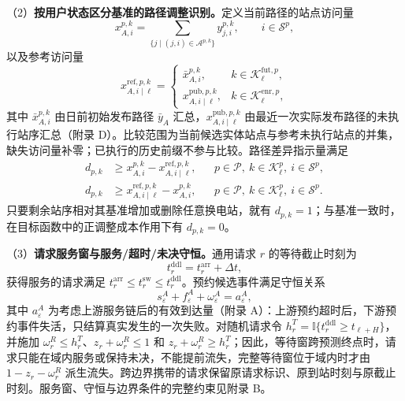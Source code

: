 \documentclass[12pt,a4paper,UTF8]{ctexart}
\begin{document}
（2）\textbf{按用户状态区分基准的路径调整识别。}定义当前路径的站点访问量
\begin{equation}
x_{A,i}^{p,k}
=
\sum_{\{j\mid(j,i)\in\mathcal A^{p,k}\}}y_{j,i}^{p,k},
\qquad i\in\mathcal S^p,
\label{eq:station_visit_indicator}
\end{equation}
以及参考访问量
\begin{equation}
x_{A,i\mid\ell}^{\mathrm{ref},p,k}
=
\begin{cases}
\bar x_{A,i}^{p,k},
&k\in\mathcal K_\ell^{\mathrm{fut},p},\\
x_{A,i\mid\ell}^{\mathrm{pub},p,k},
&k\in\mathcal K_\ell^{\mathrm{enr},p},
\end{cases}
\label{eq:reference_visit_indicator}
\end{equation}
其中 $\bar x_{A,i}^{p,k}$ 由日前初始发布路径 $\bar y_A$ 汇总，$x_{A,i\mid\ell}^{\mathrm{pub},p,k}$ 由最近一次实际发布路径的未执行站序汇总（附录 D）。比较范围为当前候选实体站点与参考未执行站点的并集，缺失访问量补零；已执行的历史前缀不参与比较。路径差异指示量满足
\begin{subequations}
\label{eq:path_adjustment_indicator}
\begin{align}
d_{p,k}
&\ge x_{A,i}^{p,k}-x_{A,i\mid\ell}^{\mathrm{ref},p,k},
&&p\in\mathcal P,\ k\in\mathcal K_\ell^p,\ i\in\mathcal S^p,\\
d_{p,k}
&\ge x_{A,i\mid\ell}^{\mathrm{ref},p,k}-x_{A,i}^{p,k},
&&p\in\mathcal P,\ k\in\mathcal K_\ell^p,\ i\in\mathcal S^p.
\end{align}
\end{subequations}
只要剩余站序相对其基准增加或删除任意换电站，就有 $d_{p,k}=1$；与基准一致时，在目标函数中的正调整成本作用下有 $d_{p,k}=0$。

（3）\textbf{请求服务窗与服务/超时/未决守恒。}通用请求 $r$ 的等待截止时刻为
\begin{equation}
t_r^{\mathrm{ddl}}
=
t_r^{\mathrm{arr}}+\Delta t,
\label{eq:waiting_deadline}
\end{equation}
获得服务的请求满足 $t_r^{\mathrm{arr}}\le t_r^{\mathrm{sw}}\le t_r^{\mathrm{ddl}}$。预约候选事件满足守恒关系
\begin{equation}
s_\varepsilon^A+f_\varepsilon^A+\omega_\varepsilon^A=a_\varepsilon^A,
\label{eq:reservation_conservation_main}
\end{equation}
其中 $a_\varepsilon^A$ 为考虑上游服务链后的有效到达量（附录 A）：上游预约超时后，下游预约事件失活，只结算真实发生的一次失败。对随机请求令 $h_r^T=\mathbb I\{t_r^{\mathrm{ddl}}\ge t_{\ell+H}\}$，并施加 $\omega_r^R\le h_r^T$、$z_r+\omega_r^R\le1$ 和 $z_r+\omega_r^R\ge h_r^T$；因此，等待窗跨预测终点时，请求只能在域内服务或保持未决，不能提前流失，完整等待窗位于域内时才由 $1-z_r-\omega_r^R$ 派生流失。跨边界携带的请求保留原请求标识、原到站时刻与原截止时刻。服务窗、守恒与边界条件的完整约束见附录 B。
\end{document}
